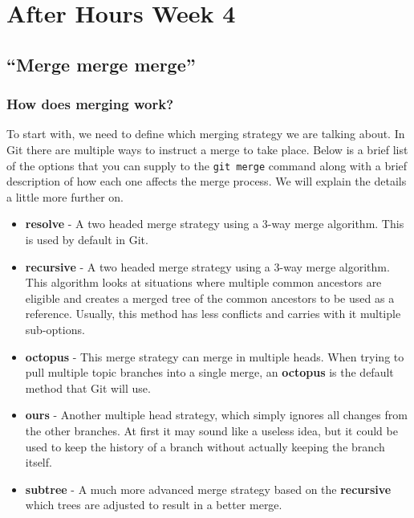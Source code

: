 \chapter{After Hours Week 4}
\section{``Merge merge merge''}
\subsection{How does merging work?}

To start with, we need to define which merging strategy we are talking about.
In Git there are multiple ways to instruct a merge to take place.
Below is a brief list of the options that you can supply to the \texttt{git merge} command along with a brief description of how each one affects the merge process.
We will explain the details a little more further on.

\begin{itemize}
\item\textbf{resolve} - A two headed merge strategy using a 3-way merge algorithm.
This is used by default in Git.
\item\textbf{recursive} - A two headed merge strategy using a 3-way merge algorithm.
This algorithm looks at situations where multiple common ancestors are eligible and creates a merged tree of the common ancestors to be used as a reference.
Usually, this method has less conflicts and carries with it multiple sub-options.
\item\textbf{octopus} - This merge strategy can merge in multiple heads.
When trying to pull multiple topic branches into a single merge, an \textbf{octopus} is the default method that Git will use.
\item\textbf{ours} - Another multiple head strategy, which simply ignores all changes from the other branches.
At first it may sound like a useless idea, but it could be used to keep the history of a branch without actually keeping the branch itself.
\item\textbf{subtree} - A much more advanced merge strategy based on the \textbf{recursive} which trees are adjusted to result in a better merge.
\end{itemize}

